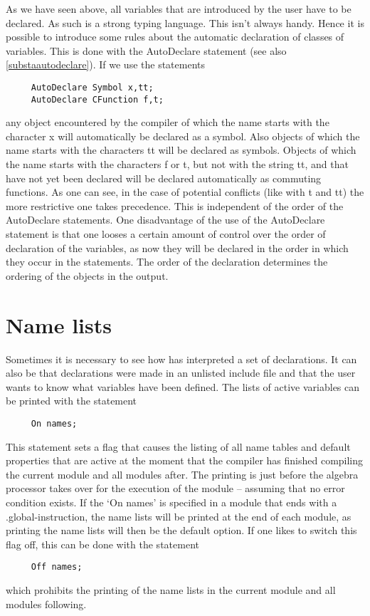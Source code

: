 As we have seen above, all variables that are introduced by the user have 
to be declared. As such {\FORM} is a strong typing 
language. This isn't always handy. Hence it is possible to introduce some 
rules about the automatic declaration of classes of variables. This is done 
with the AutoDeclare statement (see also 
\ref{substaautodeclare}). If we use the statements
\begin{verbatim}
     AutoDeclare Symbol x,tt;
     AutoDeclare CFunction f,t;
\end{verbatim}
any object encountered by the compiler of which the name starts with the 
character x will automatically be declared as a symbol. Also objects of 
which the name starts with the characters tt will be declared as symbols. 
Objects of which the name starts with the characters f or t, but not with 
the string tt, and that have not yet been declared will be declared 
automatically as commuting functions. As one can see, in the case of 
potential conflicts (like with t and tt) the more 
restrictive one takes precedence. This is independent of the order of the 
AutoDeclare statements. One disadvantage of the use of the AutoDeclare 
statement is that one looses a certain amount of control over the order of 
declaration of the variables, as now they will be declared in the order in 
which they occur in the statements. The order of the declaration determines 
the ordering of the objects in the output.

\section{Name lists}

\label{sect-namelists}
Sometimes it is necessary to see how {\FORM} has interpreted a set
of declarations. It can also be that declarations were made in an unlisted 
include file and that the user wants to know what variables have been 
defined. The lists of active variables 
can be printed with the statement
\begin{verbatim}
     On names;
\end{verbatim}
This statement sets a flag that causes the listing of all name tables and 
default properties that are active at the moment that the compiler has 
finished compiling the current module and all modules after. The printing 
is just before the algebra processor takes over for the execution of the 
module -- assuming that no error condition exists. If the `On names' is 
specified in a module that ends with a .global-instruction, the name lists 
will be printed at the end of each module, as printing the name lists will 
then be the default option. If one likes to switch this flag off, this can 
be done with the statement
\begin{verbatim}
     Off names;
\end{verbatim}
which prohibits the printing of the name lists in the current module and 
all modules following.

